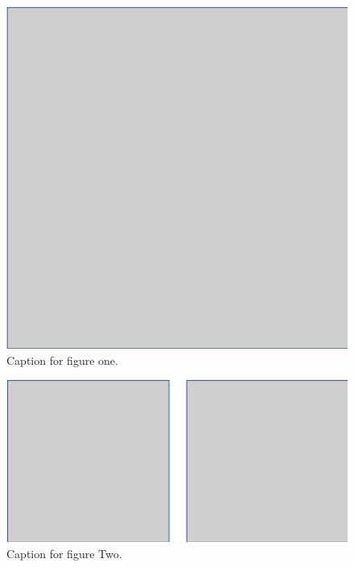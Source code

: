 \documentclass[portrait]{a0poster}	%
\begin{document}
\begin{multicols}{2}
\begin{figure}[H]
	\centering
    \includegraphics[width=35cm]{figures/figure1.png}
    \caption{Caption for figure one.}
    \label{fig:figure1}
\end{figure}

\begin{figure}[H]
	\centering
    \includegraphics[width=35cm]{figures/figure2.png}
    \caption{Caption for figure Two.}
    \label{fig:figure2}
\end{figure}

\printbibliography

\end{multicols}
\end{document}
